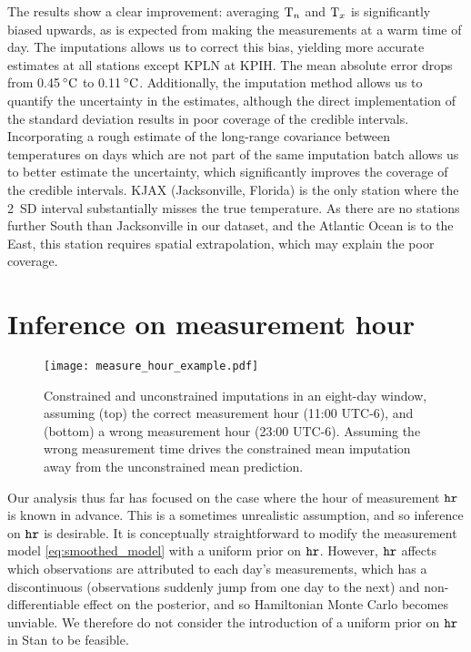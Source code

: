 The results show a clear improvement: averaging $\Tn$ and $\Tx$ is significantly biased upwards, as is expected
from making the measurements at a warm time of day.
The imputations allows us to correct this bias, yielding more accurate estimates at all stations
except KPLN at KPIH.
The mean absolute error drops from 0.45$\degreeC$ to 0.11$\degreeC$.
Additionally, the imputation method allows us to quantify the uncertainty in the estimates,
although the direct implementation of the standard deviation results in poor coverage
of the credible intervals.
Incorporating a rough estimate of the long-range covariance between
temperatures on days which are not part of the same imputation batch
allows us to better estimate the uncertainty, which significantly
improves the coverage of the credible intervals.
KJAX (Jacksonville, Florida) is the only station where the 2~SD interval substantially misses the true temperature.
As there are no stations further South than Jacksonville in our dataset, and the Atlantic Ocean is to the East,
this station requires spatial extrapolation, which may explain the poor coverage.

\section{Inference on measurement hour}
\label{sec:inferhour}

\begin{figure}[tbp]
\centering
\texttt{[image: measure\_hour\_example.pdf]}
\caption{\label{fig:measure_hour_example} Constrained and unconstrained imputations in an eight-day window, assuming (top) the correct measurement hour (11:00 UTC-6), and (bottom) a wrong measurement hour (23:00 UTC-6). Assuming the wrong measurement time drives the constrained mean imputation away from the unconstrained mean prediction.}
\end{figure}

Our analysis thus far has focused on the case where the hour of measurement \(\hour\) is known in advance.
This is a sometimes unrealistic assumption, and so inference on \(\hour\) is desirable.
It is conceptually straightforward to modify the measurement model \autoref{eq:smoothed_model} with a uniform prior on \(\hour\).
However, \(\hour\) affects which observations are attributed to each day's measurements, which has a 
discontinuous (observations suddenly jump from one day to the next) and non-differentiable effect on the posterior, 
and so Hamiltonian Monte Carlo becomes unviable.
We therefore do not consider the introduction of a uniform prior on \(\hour\) in Stan to be feasible.

